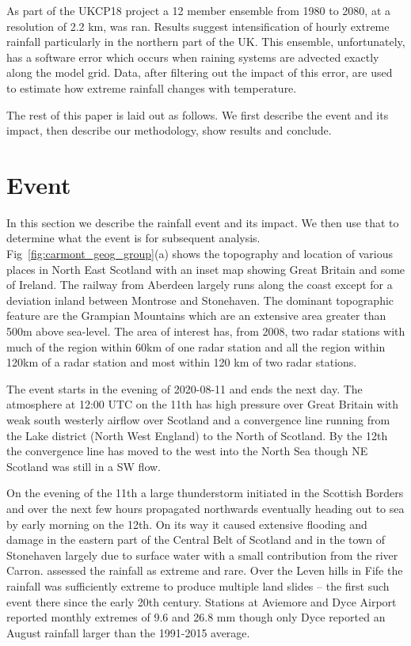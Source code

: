 \documentclass[11pt,a4paper]{article}
\begin{document}
  As part of the UKCP18 project\parencite{kendon2023uk_cpm} a 12 member ensemble from 1980 to 2080, at a resolution of 2.2 km, was ran. Results suggest intensification of hourly extreme rainfall particularly in the northern part of the UK.  This ensemble, unfortunately, has a software error which occurs when raining systems are advected exactly along the model grid.  Data, after filtering out the impact of this error, are used to estimate how extreme rainfall changes with temperature. 
 
The rest of this paper is laid out as follows. We first describe the event and its impact, then describe our methodology, show results and conclude. 


\section{Event}

In this section we describe the rainfall event and its impact. We then use that to determine what the event is for subsequent analysis. Fig~\ref{fig:carmont_geog_group}(a) shows the topography and location of various places in North East Scotland with an inset map showing Great Britain and some of Ireland. The railway from Aberdeen largely runs along the coast except for a deviation inland between Montrose and Stonehaven.  The dominant topographic feature are the Grampian Mountains which are an extensive area greater than 500m above sea-level. The area of interest has, from 2008, two radar stations with much of the region within 60km of one radar station and  all the region within 120km of a radar station and most within 120 km of two radar stations. 

  The event starts in the evening of 2020-08-11 and ends the next day. The atmosphere  at 12:00 UTC on the 11th has high pressure over Great Britain with weak south westerly airflow over Scotland and a convergence line running from the Lake district (North West England) to the North of Scotland\parencite{pritchard2020weather}. By the 12th the convergence line has moved to the west into the North Sea though NE Scotland was still in a SW flow. 

On  the evening of the 11th  a large thunderstorm initiated in the Scottish Borders and over the next few hours propagated northwards eventually heading out to sea by early morning on the 12th\parencite{Kendon2020thunderstrorms_report}. On its way it caused extensive flooding and damage in the eastern part of the Central Belt of Scotland\parencite{SEPA2020report_floods,kendon2021ukclimate} and in the town of Stonehaven largely due to surface water with a small contribution from the river Carron. \cite{SEPA2020report_floods} assessed the rainfall as  extreme and rare. Over the Leven hills in Fife the rainfall was sufficiently extreme to produce multiple land slides -- the first such event there since the early 20th century\parencite{Kirkbride2021}.  Stations at Aviemore and Dyce Airport\parencite{pritchard2020weather} reported monthly extremes of 9.6 and 26.8 mm though only Dyce reported an August rainfall larger than the 1991-2015 average. 
\end{document}
